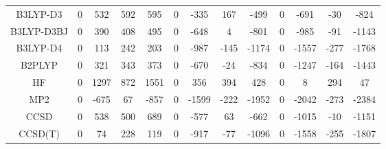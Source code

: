 \begin{table}[ht]
\begin{tabular}{ccccccccccccc}
B3LYP-D3 & 0 & 532 & 592 & 595 & 0 & -335 & 167 & -499 & 0 & -691 & -30 & -824 \\ 
B3LYP-D3BJ & 0 & 390 & 408 & 495 & 0 & -648 & 4 & -801 & 0 & -985 & -91 & -1143 \\ 
B3LYP-D4 & 0 & 113 & 242 & 203 & 0 & -987 & -145 & -1174 & 0 & -1557 & -277 & -1768 \\ 
B2PLYP & 0 & 321 & 343 & 373 & 0 & -670 & -24 & -834 & 0 & -1247 & -164 & -1443 \\ 
HF & 0 & 1297 & 872 & 1551 & 0 & 356 & 394 & 428 & 0 & 8 & 294 & 47 \\ 
MP2 & 0 & -675 & 67 & -857 & 0 & -1599 & -222 & -1952 & 0 & -2042 & -273 & -2384 \\ 
CCSD & 0 & 538 & 500 & 689 & 0 & -577 & 63 & -662 & 0 & -1015 & -10 & -1151 \\ 
CCSD(T) & 0 & 74 & 228 & 119 & 0 & -917 & -77 & -1096 & 0 & -1558 & -255 & -1807 \\ 
\hline\hline
\end{tabular}
\end{table}